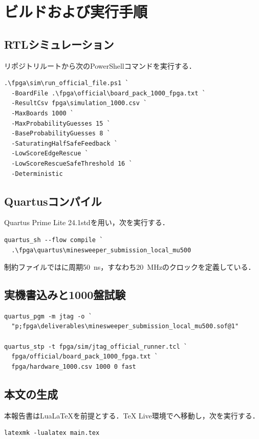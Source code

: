 \chapter{ビルドおよび実行手順}
\label{app:build-run}

\section{RTLシミュレーション}
リポジトリルートから次のPowerShellコマンドを実行する．
\begin{verbatim}
.\fpga\sim\run_official_file.ps1 `
  -BoardFile .\fpga\official\board_pack_1000_fpga.txt `
  -ResultCsv fpga\simulation_1000.csv `
  -MaxBoards 1000 `
  -MaxProbabilityGuesses 15 `
  -BaseProbabilityGuesses 8 `
  -SaturatingHalfSafeFeedback `
  -LowScoreEdgeRescue `
  -LowScoreRescueSafeThreshold 16 `
  -Deterministic
\end{verbatim}

\section{Quartusコンパイル}
Quartus Prime Lite 24.1stdを用い，次を実行する．
\begin{verbatim}
quartus_sh --flow compile `
  .\fpga\quartus\minesweeper_submission_local_mu500
\end{verbatim}
制約ファイルではに周期\SI{50}{ns}，すなわち\SI{20}{MHz}のクロックを定義している．

\section{実機書込みと1000盤試験}
\begin{verbatim}
quartus_pgm -m jtag -o `
  "p;fpga\deliverables\minesweeper_submission_local_mu500.sof@1"

quartus_stp -t fpga/sim/jtag_official_runner.tcl `
  fpga/official/board_pack_1000_fpga.txt `
  fpga/hardware_1000.csv 1000 0 fast
\end{verbatim}

\section{本文の生成}
本報告書はLuaLaTeXを前提とする．TeX Live環境でへ移動し，次を実行する．
\begin{verbatim}
latexmk -lualatex main.tex
\end{verbatim}
